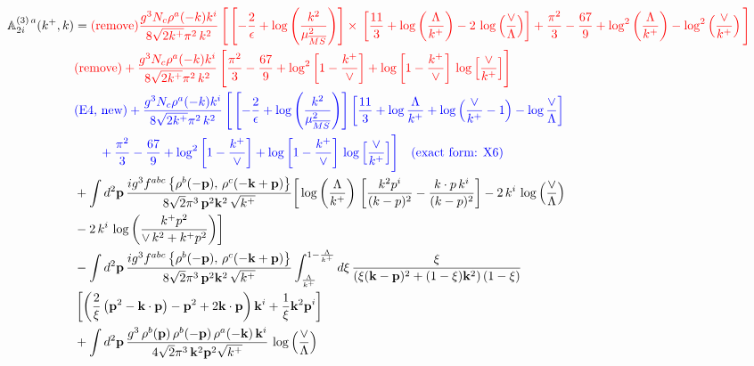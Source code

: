 \documentclass[10pt]{article}
\def\mf#1{\mathbb{#1}}
\numberwithin{equation}{section}
\begin{document}
\begin{align}
     \mf{A}^{(3)\, a}_{2i}(k^{+},k) & = \text{\color{red}(remove)}\color{red}\frac{g^{3}N_{c}\rho^{a}(-k)k^{i}}{8\sqrt{2k^{+}}\pi^{2}\,k^{2}}\,\Bigg[\left[-\frac{2}{\epsilon}+\log{\left(\frac{k^{2}}{\mu^{2}_{\overline{MS}}}\right)}\right]\times\, \left[\frac{11}{3}+\log{\left(\frac{\Lambda}{k^{+}}\right)}-2\,\log{\left(\frac{\vee}{\Lambda}\right)}\right] + \frac{\pi^{2}}{3} - \frac{67}{9} +\log^{2}\left(\frac{\Lambda}{k^{+}}\right)-\log^{2}\left(\frac{\vee}{k^{+}}\right)\Bigg]\notag \\ & \text{\color{red}(remove)}\color{red}+\frac{g^{3}N_{c}\rho^{a}(-k)k^{i}}{8\sqrt{2k^{+}}\pi^{2}\,k^{2}}\, \Bigg[\frac{\pi^{2}}{3} - \frac{67}{9} + \log^{2}{\left[1-\frac{k^{+}}{\vee}\right]}+\log{\left[1-\frac{k^{+}}{\vee}\right]}\,\log{\left[\frac{\vee}{k^{+}}\right]}\Bigg]\notag \\ & \text{\color{blue}(E4, new)}\color{blue}+\frac{g^{3}N_{c}\rho^{a}(-k)k^{i}}{8\sqrt{2k^{+}}\pi^{2}\,k^{2}}\,\Bigg[\left[-\frac{2}{\epsilon}+\log{\left(\frac{k^{2}}{\mu^{2}_{\overline{MS}}}\right)}\right]\left[\frac{11}{3}+\log\frac{\Lambda}{k^{+}}+\log\Big(\frac{\vee}{k^{+}}-1\Big)-\log\frac{\vee}{\Lambda}\right]\notag \\ & \color{blue}\qquad +\frac{\pi^{2}}{3} - \frac{67}{9} + \log^{2}{\left[1-\frac{k^{+}}{\vee}\right]}+\log{\left[1-\frac{k^{+}}{\vee}\right]}\,\log{\left[\frac{\vee}{k^{+}}\right]}\Bigg]\quad\text{\color{blue}(exact form: X6)}\notag \\ & +\int d^{2}\mathbf{p}\,\frac{ig^{3}f^{abc}\left\{ \rho^{b}(-\mathbf{p}),\,\rho^{c}(-\mathbf{k}+\mathbf{p})\right\}}{8\sqrt{2}\pi^{3}\,\mathbf{p}^{2}\mathbf{k}^{2}\,\sqrt{k^{+}}}\bigg[\log{\left(\frac{\Lambda}{k^{+}}\right)}\,\left[\frac{k^{2}p^{i}}{(k-p)^{2}}-\frac{k\cdot p\,k^{i}}{(k-p)^{2}}\right] -2\,k^{i}\,\log{\left(\frac{\vee}{\Lambda}\right)}\notag \\ &  -2\,k^{i}\,\log{\left(\frac{k^{+}p^{2}}{\vee\, k^{2}+k^{+}p^{2}}\right)}\bigg]\notag \\ &   - \int d^{2}\mathbf{p}\,\frac{ig^{3}f^{abc}\left\{ \rho^{b}(-\mathbf{p}),\,\rho^{c}(-\mathbf{k}+\mathbf{p})\right\}}{8\sqrt{2}\pi^{3}\,\mathbf{p}^{2}\mathbf{k}^{2}\,\sqrt{k^{+}}}\int_{\frac{\Lambda}{k^{+}}}^{1-\frac{\Lambda}{k^{+}}}d\xi\,\frac{\xi}{\left(\xi(\mathbf{k}-\mathbf{p})^{2}+(1-\xi)\mathbf{k}^{2}\right)(1-\xi)}\notag \\ & \left[\left(\frac{2}{\xi}\left(\mathbf{p}^{2}-\mathbf{k}\cdot\mathbf{p}\right)-\mathbf{p}^{2}+2\mathbf{k}\cdot\mathbf{p}\right)\mathbf{k}^{i} +\frac{1}{\xi}\mathbf{k}^{2}\mathbf{p}^{i}\right] \notag \\ & +\int d^{2}\mathbf{p}\,\frac{g^{3}\,\rho^{b}(\mathbf{p})\,\rho^{b}(-\mathbf{p})\,\rho^{a}(-\mathbf{k})\, \mathbf{k}^{i}}{4\sqrt{2}\pi^{3}\,\mathbf{k}^{2}\mathbf{p}^{2}\sqrt{k^{+}}}\,\log{\left(\frac{\vee}{\Lambda}\right)} 
\end{align}
\end{document}

